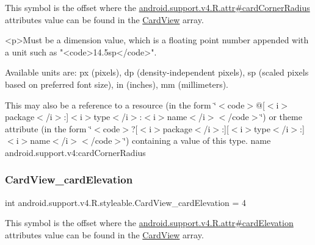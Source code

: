 This symbol is the offset where the \hyperlink{classandroid_1_1support_1_1v4_1_1R_1_1attr_a6a6c34d8de2d1debea95fc7926cbc269}{android.\+support.\+v4.\+R.\+attr\#card\+Corner\+Radius} attribute\textquotesingle{}s value can be found in the \hyperlink{classandroid_1_1support_1_1v4_1_1R_1_1styleable_a0e520cd4c78beb0d456e4018c4ba0e86}{Card\+View} array.

\begin{DoxyVerb}      <p>Must be a dimension value, which is a floating point number appended with a unit such as "<code>14.5sp</code>".
\end{DoxyVerb}
 Available units are\+: px (pixels), dp (density-\/independent pixels), sp (scaled pixels based on preferred font size), in (inches), mm (millimeters). 

This may also be a reference to a resource (in the form \char`\"{}$<$code$>$@\mbox{[}$<$i$>$package$<$/i$>$\+:\mbox{]}$<$i$>$type$<$/i$>$\+:$<$i$>$name$<$/i$>$$<$/code$>$\char`\"{}) or theme attribute (in the form \char`\"{}$<$code$>$?\mbox{[}$<$i$>$package$<$/i$>$\+:\mbox{]}\mbox{[}$<$i$>$type$<$/i$>$\+:\mbox{]}$<$i$>$name$<$/i$>$$<$/code$>$\char`\"{}) containing a value of this type.  name android.\+support.\+v4\+:card\+Corner\+Radius \mbox{\label{classandroid_1_1support_1_1v4_1_1R_1_1styleable_a6978e1a529e4bd289788c4b5ae24873c}} 
\subsubsection{\texorpdfstring{Card\+View\+\_\+card\+Elevation}{CardView\_cardElevation}}
{\footnotesize\ttfamily int android.\+support.\+v4.\+R.\+styleable.\+Card\+View\+\_\+card\+Elevation = 4\hspace{0.3cm}{\ttfamily [static]}}

This symbol is the offset where the \hyperlink{classandroid_1_1support_1_1v4_1_1R_1_1attr_ae0e8dfe0af81d234bebc4a066c5b5c2f}{android.\+support.\+v4.\+R.\+attr\#card\+Elevation} attribute\textquotesingle{}s value can be found in the \hyperlink{classandroid_1_1support_1_1v4_1_1R_1_1styleable_a0e520cd4c78beb0d456e4018c4ba0e86}{Card\+View} array.

